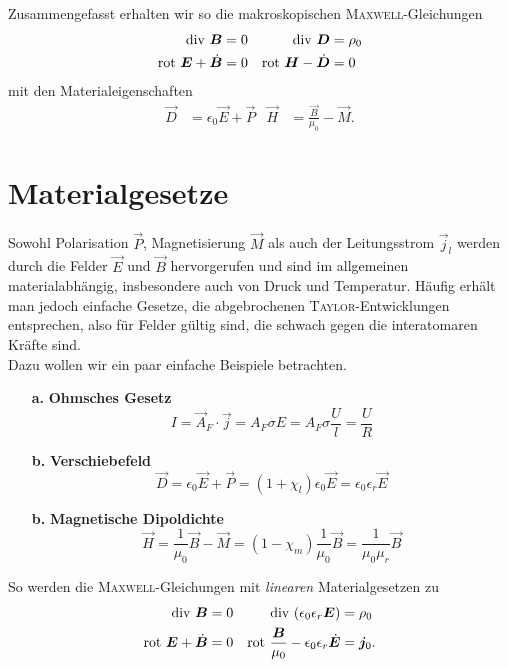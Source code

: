 Zusammengefasst erhalten wir so die makroskopischen \textsc{Maxwell}-Gleichungen
\begin{align*}
\text{div }\bm{B} &=0 &\text{div }\bm{D} &= \rho_0\\
\text{rot } \bm{E} + \dot{\bm{B}} &= 0 &\text{rot } \bm{H}-\dot{\bm{D}}&=0
\end{align*}
mit den Materialeigenschaften
\begin{align*}
\vec{D}&=\epsilon_0\vec{E}+\vec{P} &\vec{H} &= \frac{\vec{B}}{\mu_0} -\vec{M}.
\end{align*}

\section{Materialgesetze}

Sowohl Polarisation $\vec{P}$, Magnetisierung $\vec{M}$ als auch der Leitungsstrom $\vec{j}_l$ werden durch die Felder $\vec{E}$ und $\vec{B}$ hervorgerufen und sind im allgemeinen materialabhängig, insbesondere auch von Druck und Temperatur. Häufig erhält man jedoch einfache Gesetze, die abgebrochenen \textsc{Taylor}-Entwicklungen entsprechen, also für Felder gültig sind, die schwach gegen die interatomaren Kräfte sind.\\
Dazu wollen wir ein paar einfache Beispiele betrachten.

\begin{enumerate}
	\item[\textbf{a.}] \textbf{Ohmsches Gesetz}
	\begin{equation*}
	I = \vec{A}_F\cdot\vec{j} = A_F\sigma E = A_F\sigma\frac{U}{l} = \frac{U}{R}
	\end{equation*}
	\item[\textbf{b.}] \textbf{Verschiebefeld}
	\begin{equation*}
	\vec{D}=\epsilon_0\vec{E}+\vec{P}=(1+\chi_l)\epsilon_0\vec{E}=\epsilon_0\epsilon_r \vec{E}
	\end{equation*}
	\item[\textbf{b.}] \textbf{Magnetische Dipoldichte}
	\begin{equation*}
	\vec{H} = \frac{1}{\mu_0}\vec{B}-\vec{M} = (1-\chi_m)\frac{1}{\mu_0}\vec{B}  = \frac{1}{\mu_0\mu_r}\vec{B}
	\end{equation*} 
\end{enumerate}

So werden die \textsc{Maxwell}-Gleichungen mit \emph{linearen} Materialgesetzen zu
\begin{align*}
\text{div }\bm{B}&=0 &\text{div }(\epsilon_0\epsilon_r\bm{E})&=\rho_0\\
\text{rot } \bm{E}+\dot{\bm{B}}&=0 &\text{rot }\frac{\bm{B}}{\mu_0}-\epsilon_0\epsilon_r\dot{\bm{E}}&=\bm{j}_0.
\end{align*}

